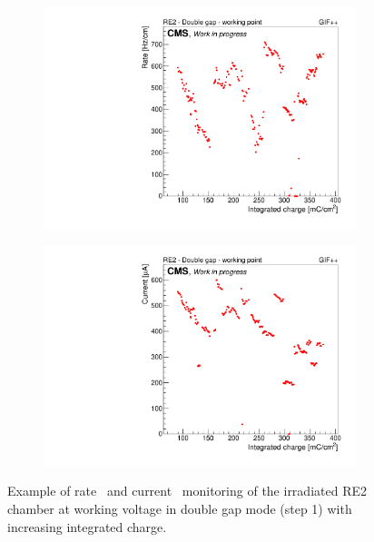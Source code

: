 	\begin{figure}[H]
    	\begin{subfigure}{0.5\linewidth}
			\centering
    		\includegraphics[width = 0.5\plotwidth]{fig/chapt5/GIFpp-Rate-vs-Q.pdf}
        	\caption{\label{fig:rate-I-monitor:A}}
    	\end{subfigure}
    	\begin{subfigure}{0.5\linewidth}
			\centering
    		\includegraphics[width = 0.5\plotwidth]{fig/chapt5/GIFpp-I-vs-Q.pdf}
        	\caption{\label{fig:rate-I-monitor:B}}
    	\end{subfigure}
		\caption{\label{fig:rate-I-monitor} Example of rate~ and current~ monitoring of the irradiated RE2 chamber at working voltage in double gap mode (step 1) with increasing integrated charge.}
	\end{figure}

